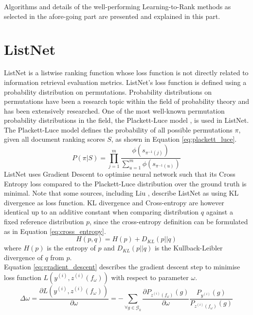 Algorithms and details of the well-performing Learning-to-Rank methods as selected in the afore-going part are presented and explained in this part.

\section{ListNet}
ListNet \cite{Cao2007} is a listwise ranking function whose loss function is not directly related to information retrieval evaluation metrics. ListNet's loss function is defined using a probability distribution on permutations. Probability distributions on permutations have been a research topic within the field of probability theory and has been extensively researched. One of the most well-known permutation probability distributions in the field, the Plackett-Luce model \cite{Plackett1975,Luce1959}, is used in ListNet. The Plackett-Luce model defines the probability of all possible permutations $\pi$, given all document ranking scores $S$, as shown in Equation \ref{eq:plackett_luce}.
\begin{equation}
P(\pi|S) = \prod\limits_{j=1}^{m}\frac{\phi(s_{\pi^{-1}(j)})}{\sum\nolimits_{u=1}^{m}\phi(s_{\pi^{-1}(u)})}
\label{eq:plackett_luce}
\end{equation}
ListNet uses Gradient Descent to optimise neural network such that its Cross Entropy loss compared to the Plackett-Luce distribution over the ground truth is minimal. Note that some sources, including Liu \cite{Liu2007}, describe ListNet as using KL divergence as loss function. KL divergence and Cross-entropy are however identical up to an additive constant when comparing distribution $q$ against a fixed reference distribution $p$, since the cross-entropy definition can be formulated as in Equation \ref{eq:cross_entropy}.
\begin{equation}
H(p,q) = H(p) + D_{KL}(p||q)
\label{eq:cross_entropy}
\end{equation}
where $H(p)$ is the entropy of $p$ and $D_{KL}(p||q)$ is the Kullback-Leibler divergence of $q$ from $p$.\\

\noindent Equation \ref{eq:gradient_descent} describes the gradient descent step to minimise loss function $L(y^{(i)},z^{(i)}(f_\omega))$ with respect to parameter $\omega$. 
\begin{equation}
\Delta\omega = \frac{\partial L(y^{(i)},z^{(i)}(f_\omega))}{\partial \omega} = - \sum_{\forall g \in \mathscr{G}_k}\limits\frac{\partial P_{z^{(i)}(f_\omega)}(g)}{\partial \omega}\frac{P_{y^{(i)}}(g)}{P_{z^{(i)}(f_\omega)}(g)}
\label{eq:gradient_descent}
\end{equation}

